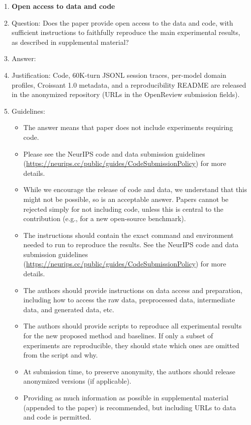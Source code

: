 \documentclass[11pt]{article}
\begin{document}
\begin{enumerate}
\item {\bf Open access to data and code}
    \item[] Question: Does the paper provide open access to the data and code, with sufficient instructions to faithfully reproduce the main experimental results, as described in supplemental material?
    \item[] Answer: \answerYes{}
    \item[] Justification: Code, 60K-turn JSONL session traces, per-model domain profiles, Croissant 1.0 metadata, and a reproducibility README are released in the anonymized repository (URLs in the OpenReview submission fields).
    \item[] Guidelines:
    \begin{itemize}
        \item The answer \answerNA{} means that paper does not include experiments requiring code.
        \item Please see the NeurIPS code and data submission guidelines (\url{https://neurips.cc/public/guides/CodeSubmissionPolicy}) for more details.
        \item While we encourage the release of code and data, we understand that this might not be possible, so \answerNo{} is an acceptable answer. Papers cannot be rejected simply for not including code, unless this is central to the contribution (e.g., for a new open-source benchmark).
        \item The instructions should contain the exact command and environment needed to run to reproduce the results. See the NeurIPS code and data submission guidelines (\url{https://neurips.cc/public/guides/CodeSubmissionPolicy}) for more details.
        \item The authors should provide instructions on data access and preparation, including how to access the raw data, preprocessed data, intermediate data, and generated data, etc.
        \item The authors should provide scripts to reproduce all experimental results for the new proposed method and baselines. If only a subset of experiments are reproducible, they should state which ones are omitted from the script and why.
        \item At submission time, to preserve anonymity, the authors should release anonymized versions (if applicable).
        \item Providing as much information as possible in supplemental material (appended to the paper) is recommended, but including URLs to data and code is permitted.
    \end{itemize}



\end{enumerate}
\end{document}
